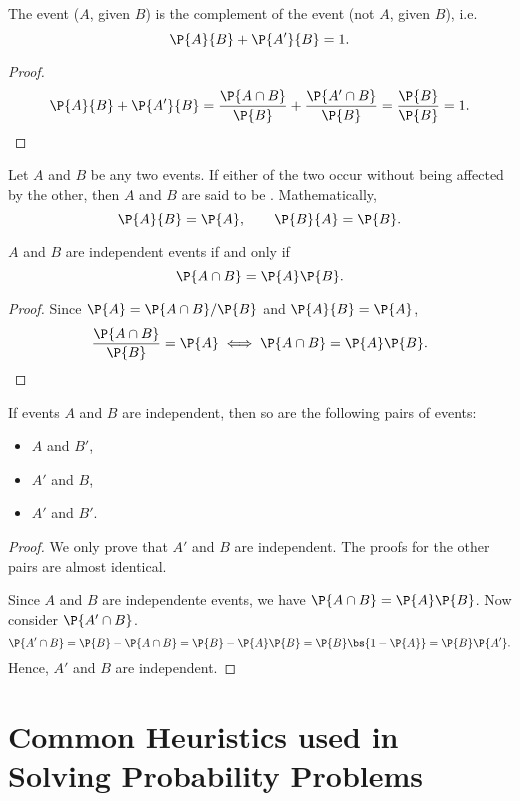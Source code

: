 \begin{corollary}
    The event ($A$, given $B$) is the complement of the event (not $A$, given $B$), i.e. \[\P{A}{B} + \P{A'}{B} = 1.\]
\end{corollary}
\begin{proof}
    \[\P{A}{B} + \P{A'}{B} = \frac{\P{A \cap B}}{\P{B}} + \frac{\P{A' \cap B}}{\P{B}} = \frac{\P{B}}{\P{B}} = 1.\]
\end{proof}

\begin{definition}
    Let $A$ and $B$ be any two events. If either of the two occur without being affected by the other, then $A$ and $B$ are said to be . Mathematically, \[\P{A}{B} = \P{A}, \qquad \P{B}{A} = \P{B}.\]
\end{definition}

\begin{proposition}
    $A$ and $B$ are independent events if and only if \[\P{A \cap B} = \P{A}\P{B}.\]
\end{proposition}
\begin{proof}
    Since $\P{A} = \P{A \cap B} / \P{B}$ and $\P{A}{B} = \P{A}$, \[\frac{\P{A \cap B}}{\P{B}} = \P{A} \iff \P{A \cap B} = \P{A}\P{B}.\]
\end{proof}

\begin{proposition}
    If events $A$ and $B$ are independent, then so are the following pairs of events:
    \begin{itemize}
        \item $A$ and $B'$,
        \item $A'$ and $B$,
        \item $A'$ and $B'$.
    \end{itemize}
\end{proposition}
\begin{proof}
    We only prove that $A'$ and $B$ are independent. The proofs for the other pairs are almost identical.

    Since $A$ and $B$ are independente events, we have $\P{A \cap B} = \P{A} \P{B}$. Now consider $\P{A' \cap B}$. \[\P{A' \cap B} = \P{B} - \P{A \cap B} = \P{B} - \P{A}\P{B} = \P{B} \bs{1 - \P{A}} = \P{B} \P{A'}.\] Hence, $A'$ and $B$ are independent.
\end{proof}

\section{Common Heuristics used in Solving Probability Problems}

